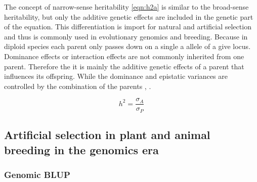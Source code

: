 The concept of narrow-sense heritability \ref{eqn:h2a} is similar to the broad-sense heritability, but only the additive
genetic effects are included in the genetic part of the equation. This differentiation is import for natural and
artificial selection and thus is commonly used in evolutionary genomics and breeding. Because in diploid species each
parent only passes down on a single a allele of a give locus. Dominance effects or interaction effects are not commonly
inherited from one parent. Therefore the it is mainly the additive genetic effects of a parent that influences its
offspring. While the dominance and epistatic variances are controlled by the combination of the parents
\cite{falconer1996}, \cite{walsh2018}.

\begin{equation}
 h^2 = \frac{\sigma_{A}}{\sigma_{P}}
 \label{eqn:h2a}
\end{equation}



\subsection{Artificial selection in plant and animal breeding in the genomics era}
\subsubsection{Genomic BLUP}

